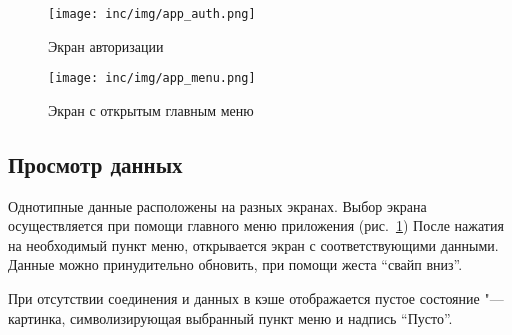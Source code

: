 \begin{figure}[ht]
    \texttt{[image: inc/img/app\_auth.png]}
    \caption{Экран авторизации}
    \label{fig:auth}
  \endminipage\hfill
    \texttt{[image: inc/img/app\_menu.png]}
    \caption{Экран с открытым главным меню}
    \label{fig:menu}
  \endminipage
\end{figure}

\subsection*{Просмотр данных}
Однотипные данные расположены на разных экранах.
Выбор экрана осуществляется при помощи главного меню приложения (рис.~\ref{fig:menu})
После нажатия на необходимый пункт меню, открывается экран с соответствующими данными.
Данные можно принудительно обновить, при помощи жеста ``свайп вниз''.

При отсутствии соединения и данных в кэше отображается пустое состояние "--- картинка, символизирующая выбранный пункт меню и надпись ``Пусто''.
